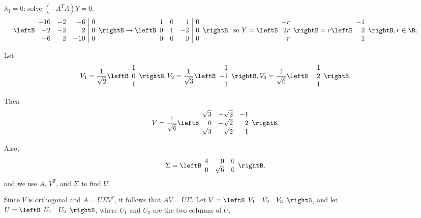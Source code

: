 \begin{solution}
$\lambda_3=0$: solve $(-A^TA)Y= 0$.
\[ \leftB\begin{array}{rrr|r}
-10 & -2 & -6 & 0 \\ -2 & -2 & 2 & 0 \\ -6 & 2 & -10 & 0
\end{array}\rightB
\rightarrow
\leftB\begin{array}{rrr|r}
1 & 0 & 1 & 0 \\ 0 & 1 & -2 & 0 \\ 0 & 0 & 0 & 0
\end{array}\rightB,
\mbox{ so }
Y=\leftB\begin{array}{r} -r \\ 2r \\ r \end{array}\rightB
=r\leftB\begin{array}{r} -1 \\ 2 \\ 1 \end{array}\rightB,
r\in \R. \]


Let
\[ V_1=\frac{1}{\sqrt{2}}\leftB\begin{array}{r} 1\\ 0\\ 1 \end{array}\rightB,
V_2=\frac{1}{\sqrt{3}}\leftB\begin{array}{r} -1\\ -1\\ 1 \end{array}\rightB,
V_3=\frac{1}{\sqrt{6}}\leftB\begin{array}{r} -1\\ 2\\ 1 \end{array}\rightB.\]

Then
\[ V=\frac{1}{\sqrt{6}}\leftB\begin{array}{rrr}
\sqrt 3 & -\sqrt 2 & -1  \\
0 & -\sqrt 2 & 2 \\
\sqrt 3 & \sqrt 2 & 1 \end{array}\rightB.\]

Also,
\[ \Sigma = \leftB\begin{array}{rrr} 4 & 0 & 0 \\
0 & \sqrt 6 & 0 \end{array}\rightB,\]
and we use $A$, $V^T$, and $\Sigma$ to find $U$.

Since $V$ is orthogonal and $A=U\Sigma V^T$, it follows that $AV=U\Sigma$.
Let $V=\leftB\begin{array}{ccc} V_1 & V_2 & V_3 \end{array}\rightB$, and
let $U=\leftB\begin{array}{cc} U_1 & U_2 \end{array}\rightB$, where
$U_1$ and $U_2$ are the two columns of $U$.


\end{solution}
